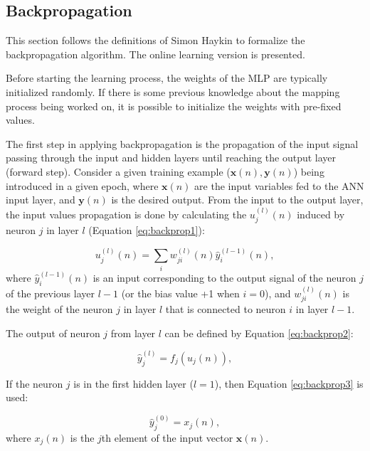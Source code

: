 \subsection{Backpropagation}
\label{ssec:Pseudocodigo}

This section follows the definitions of Simon Haykin \cite{haykin} to formalize the backpropagation algorithm. The online learning version is presented.

Before starting the learning process, the weights of the MLP are typically initialized randomly. If there is some previous knowledge about the mapping process being worked on, it is possible to initialize the weights with pre-fixed values.  

The first step in applying backpropagation is the propagation of the input signal passing through the input and hidden layers until reaching the output layer (forward step). 
Consider a given training example ($\mathbf{x}(n), \mathbf{y}(n)$) being introduced in a given epoch, where $\mathbf{x}(n)$ are the input variables fed to the ANN input layer, and $\mathbf{y}(n)$ is the desired output. From the input to the output layer, the input values propagation is done by calculating the $u_j^{(l)}(n)$  induced by neuron $j$ in layer $l$ (Equation \ref{eq:backprop1}):


\begin{equation}
\label{eq:backprop1}
    u_j^{(l)}(n) = \sum_i w_{ji}^{(l)}(n) \hat{y}_i^{(l-1)}(n),
\end{equation}
where $\hat{y}_i^{(l-1)}(n)$ is an input corresponding to the output signal of the neuron $j$ of the previous layer $l-1$ (or the bias value +1 when $i=0$), and $w_{ji}^{(l)}(n)$ is the weight of the neuron $j$ in layer $l$ that is connected to neuron $i$ in layer $l-1$.

The output of neuron $j$ from layer $l$ can be defined by Equation \ref{eq:backprop2}:

\begin{equation}
\label{eq:backprop2}
    \hat{y}_j^{(l)} = f_j (u_j (n) ),
\end{equation}

If the neuron $j$ is in the first hidden layer ($l = 1$), then Equation \ref{eq:backprop3} is used:

\begin{equation}
    \label{eq:backprop3}
    \hat{y}_j^{(0)} = x_j (n),
\end{equation}
where $x_j(n)$ is the $j$th element of the input vector $\mathbf{x}(n)$. 

